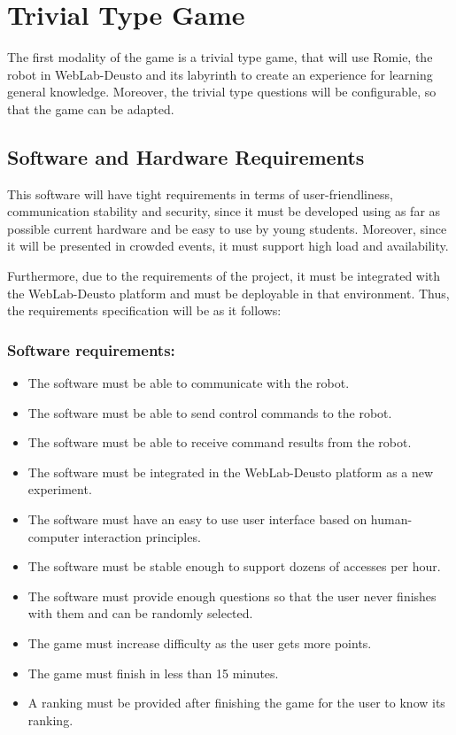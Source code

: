 \section{Trivial Type Game}

The first modality of the game is a trivial type game, that will use Romie, the robot in
WebLab-Deusto and its labyrinth to create an experience for learning general knowledge. Moreover,
the trivial type questions will be configurable, so that the game can be adapted.

\subsection{Software and Hardware Requirements}

This software will have tight requirements in terms of user-friendliness, communication stability
and security, since it must be developed using as far as possible current hardware and be easy to
use by young students. Moreover, since it will be presented in crowded events, it must support high
load and availability.

Furthermore, due to the requirements of the project, it must be integrated with the WebLab-Deusto
platform and must be deployable in that environment. Thus, the requirements specification will be
as it follows:

\subsubsection{Software requirements:}

\begin{itemize}
	\item The software must be able to communicate with the robot.
	\item The software must be able to send control commands to the robot.
	\item The software must be able to receive command results from the robot.
	\item The software must be integrated in the WebLab-Deusto platform as a new experiment.
	\item The software must have an easy to use user interface based on human-computer interaction
	principles.
	\item The software must be stable enough to support dozens of accesses per hour.
	\item The software must provide enough questions so that the user never finishes with them and
	can be randomly selected.
	\item The game must increase difficulty as the user gets more points.
	\item The game must finish in less than 15 minutes.
	\item A ranking must be provided after finishing the game for the user to know its ranking.
\end{itemize}

